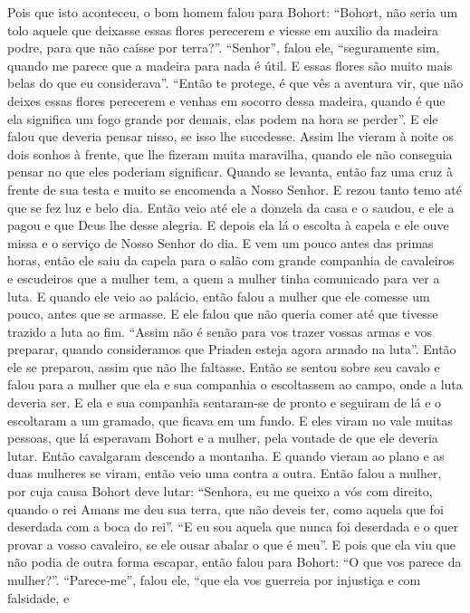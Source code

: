 Pois que isto aconteceu, o bom homem falou para Bohort: “Bohort, não seria um
tolo aquele que deixasse essas flores perecerem e viesse em auxilio da madeira
podre, para que não caísse por terra?”. “Senhor”, falou ele, “seguramente sim,
quando me parece que a madeira para nada é útil. E essas flores são muito mais
belas do que eu considerava”. “Então te protege, é que vês a aventura vir, que
não deixes essas flores perecerem e venhas em socorro dessa madeira, quando é
que ela significa um fogo grande por demais, elas podem na hora se perder”. E
ele falou que deveria pensar nisso, se isso lhe sucedesse.
Assim lhe vieram à noite os dois sonhos à frente, que lhe fizeram muita
maravilha, quando ele não conseguia pensar no que eles poderiam significar.
Quando se levanta, então faz uma cruz à frente de sua testa e muito se
encomenda a Nosso Senhor. E rezou tanto temo até que se fez luz e belo dia.
Então veio até ele a donzela da casa e o saudou, e ele a pagou e que Deus lhe
desse alegria. E depois ela lá o escolta à capela e ele ouve missa e o serviço
de Nosso Senhor do dia. E vem um pouco antes das primas horas, então ele saiu
da capela para o salão com grande companhia de cavaleiros e escudeiros que a
mulher tem, a quem a mulher tinha comunicado para ver a luta. E quando ele veio
ao palácio, então falou a mulher que ele comesse um pouco, antes que se
armasse. E ele falou que não queria comer até que tivesse trazido a luta ao
fim. “Assim não é senão para vos trazer vossas armas e vos preparar, quando
consideramos que Priaden esteja agora armado na luta”. Então ele se preparou,
assim que não lhe faltasse. Então se sentou sobre seu cavalo e falou para a
mulher que ela e sua companhia o escoltassem ao campo, onde a luta deveria ser.
E ela e sua companhia sentaram-se de pronto e seguiram de lá e o escoltaram a
um gramado, que ficava em um fundo. E eles viram no vale muitas pessoas, que lá
esperavam Bohort e a mulher, pela vontade de que ele deveria lutar. Então
cavalgaram descendo a montanha. E quando vieram ao plano e as duas mulheres se
viram, então veio uma contra a outra. Então falou a mulher, por cuja causa
Bohort deve lutar: “Senhora, eu me queixo a vós com direito, quando o rei Amans
me deu sua terra, que não deveis ter, como aquela que foi deserdada com a boca
do rei”. “E eu sou aquela que nunca foi deserdada e o quer provar a vosso
cavaleiro, se ele ousar abalar o que é meu”. E pois que ela viu que não podia
de outra forma escapar, então falou para Bohort: “O que vos parece da mulher?”.
“Parece-me”, falou ele, “que ela vos guerreia por injustiça e com falsidade, e
